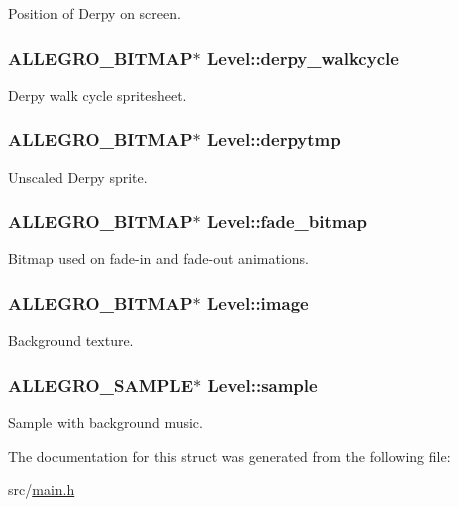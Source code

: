 \-Position of \-Derpy on screen. \hypertarget{structLevel_ab6a78c50cda8424f722ca249f5466f67}{
\subsubsection[{derpy\-\_\-walkcycle}]{\setlength{\rightskip}{0pt plus 5cm}\-A\-L\-L\-E\-G\-R\-O\-\_\-\-B\-I\-T\-M\-A\-P$\ast$ {\bf \-Level\-::derpy\-\_\-walkcycle}}}\label{structLevel_ab6a78c50cda8424f722ca249f5466f67}
\-Derpy walk cycle spritesheet. \hypertarget{structLevel_ac21ed7629a60287bf8612f98abd3d9b6}{
\subsubsection[{derpytmp}]{\setlength{\rightskip}{0pt plus 5cm}\-A\-L\-L\-E\-G\-R\-O\-\_\-\-B\-I\-T\-M\-A\-P$\ast$ {\bf \-Level\-::derpytmp}}}\label{structLevel_ac21ed7629a60287bf8612f98abd3d9b6}
\-Unscaled \-Derpy sprite. \hypertarget{structLevel_a1a9629222f6536790772ad7af5d2413c}{
\subsubsection[{fade\-\_\-bitmap}]{\setlength{\rightskip}{0pt plus 5cm}\-A\-L\-L\-E\-G\-R\-O\-\_\-\-B\-I\-T\-M\-A\-P$\ast$ {\bf \-Level\-::fade\-\_\-bitmap}}}\label{structLevel_a1a9629222f6536790772ad7af5d2413c}
\-Bitmap used on fade-\/in and fade-\/out animations. \hypertarget{structLevel_a29a3fe4b6d80ae62843840aa6afa0596}{
\subsubsection[{image}]{\setlength{\rightskip}{0pt plus 5cm}\-A\-L\-L\-E\-G\-R\-O\-\_\-\-B\-I\-T\-M\-A\-P$\ast$ {\bf \-Level\-::image}}}\label{structLevel_a29a3fe4b6d80ae62843840aa6afa0596}
\-Background texture. \hypertarget{structLevel_a234fa7b9ec35dd360e4e3c48a944fc7d}{
\subsubsection[{sample}]{\setlength{\rightskip}{0pt plus 5cm}\-A\-L\-L\-E\-G\-R\-O\-\_\-\-S\-A\-M\-P\-L\-E$\ast$ {\bf \-Level\-::sample}}}\label{structLevel_a234fa7b9ec35dd360e4e3c48a944fc7d}
\-Sample with background music. 

\-The documentation for this struct was generated from the following file\-:\begin{DoxyCompactItemize}
\item 
src/\hyperlink{main_8h}{main.\-h}\end{DoxyCompactItemize}
